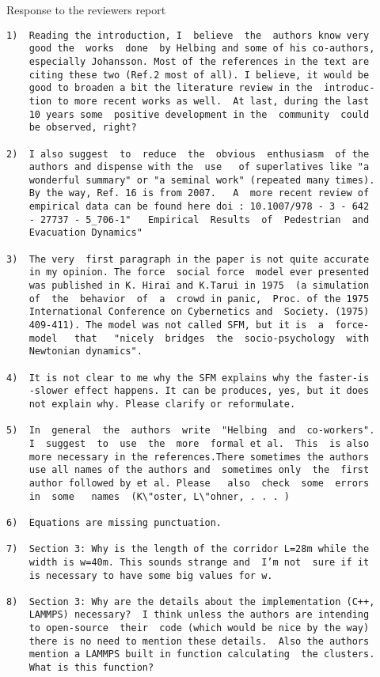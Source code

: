 \documentclass[a4paper,12pt]{letter}
\begin{document}
\begin{letter}{Response to the reviewers report}
\begin{verbatim}
1)  Reading the introduction, I  believe  the  authors know very
    good the  works  done  by Helbing and some of his co-authors,
    especially Johansson. Most of the references in the text are
    citing these two (Ref.2 most of all). I believe, it would be
    good to broaden a bit the literature review in the  introduc-
    tion to more recent works as well.  At last, during the last
    10 years some  positive development in the  community  could 
    be observed, right?

2)  I also suggest  to  reduce  the  obvious  enthusiasm  of the
    authors and dispense with the  use   of superlatives like "a 
    wonderful summary" or "a seminal work" (repeated many times). 
    By the way, Ref. 16 is from 2007.   A  more recent review of
    empirical data can be found here doi : 10.1007/978 - 3 - 642
    - 27737 - 5_706-1"   Empirical  Results  of  Pedestrian  and 
    Evacuation Dynamics"

3)  The very  first paragraph in the paper is not quite accurate
    in my opinion. The force  social force  model ever presented
    was published in K. Hirai and K.Tarui in 1975  (a simulation
    of  the  behavior  of  a  crowd in panic,  Proc. of the 1975 
    International Conference on Cybernetics and  Society. (1975)
    409-411). The model was not called SFM, but it is  a  force-
    model   that   "nicely  bridges  the  socio-psychology  with 
    Newtonian dynamics".

4)  It is not clear to me why the SFM explains why the faster-is
    -slower effect happens. It can be produces, yes, but it does
    not explain why. Please clarify or reformulate.

5)  In  general  the  authors  write  "Helbing  and  co-workers".
    I  suggest  to  use  the  more  formal et al.  This  is also
    more necessary in the references.There sometimes the authors
    use all names of the authors and  sometimes only  the  first
    author followed by et al. Please   also  check  some  errors
    in  some   names  (K\"oster, L\"ohner, . . . )

6)  Equations are missing punctuation.

7)  Section 3: Why is the length of the corridor L=28m while the
    width is w=40m. This sounds strange and  I’m not  sure if it 
    is necessary to have some big values for w.

8)  Section 3: Why are the details about the implementation (C++, 
    LAMMPS) necessary?  I think unless the authors are intending
    to open-source  their  code (which would be nice by the way)
    there is no need to mention these details.  Also the authors
    mention a LAMMPS built in function calculating  the clusters.
    What is this function?


\end{verbatim}
\end{letter}
\end{document}
